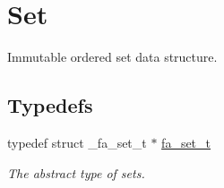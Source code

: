\hypertarget{group___fa_set}{\section{Set}
\label{group___fa_set}
}


Immutable ordered set data structure.  


\subsection*{Typedefs}
\begin{DoxyCompactItemize}
\item 
typedef struct \-\_\-fa\-\_\-set\-\_\-t $\ast$ \hyperlink{group___fa_set_ga7a64878223baf48e12857d8d5fda700c}{fa\-\_\-set\-\_\-t}
\begin{DoxyCompactList}\small\item\em The abstract type of sets. \end{DoxyCompactList}\end{DoxyCompactItemize}
